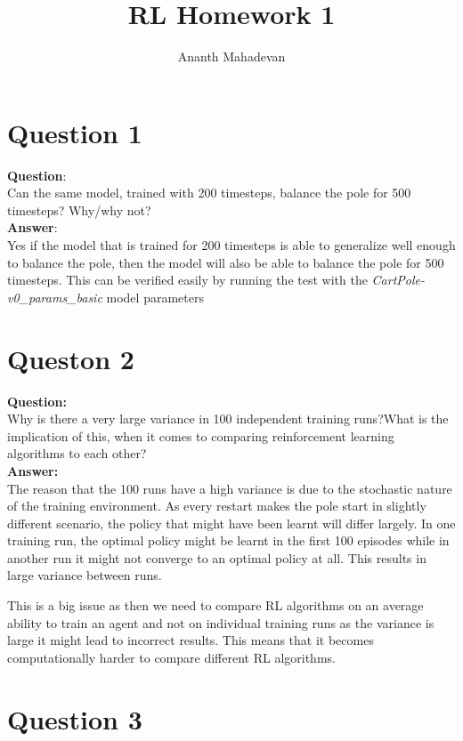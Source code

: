 \documentclass[a4paper]{article}
\title{RL Homework 1}
\author{Ananth Mahadevan}
\begin{document}
\maketitle
\clearpage
\tableofcontents
\clearpage

\section{Question 1}
\textbf{Question}:\\
Can the same model, trained with 200 timesteps, balance the pole for 500 timesteps? Why/why not?
\\
\textbf{Answer}:\\
Yes if the model that is trained for 200 timesteps is able to generalize well enough to balance the pole, then the model will also be able to balance the pole for 500 timesteps. This can be verified easily by running the test with the \textit{CartPole-v0\_params\_basic} model parameters

\section{Queston 2}
\textbf{Question:}\\
Why is there a very large variance in 100 independent training runs?What is the implication of this, when it comes to comparing reinforcement learning algorithms to each other?
\\
\textbf{Answer:}\\
The reason that the 100 runs have a high variance is due to the stochastic nature of the training environment. As every restart makes the pole start in slightly different scenario, the policy that might have been learnt will differ largely. In one training run, the optimal policy might be learnt in the first 100 episodes while in another run it might not converge to an optimal policy at all. This results in large variance between runs.

This is a big issue as then we need to compare RL algorithms on an average ability to train an agent and not on individual training runs as the variance is large it might lead to incorrect results. This means that it becomes computationally harder to compare different RL algorithms.

\section{Question 3}
\end{document}
